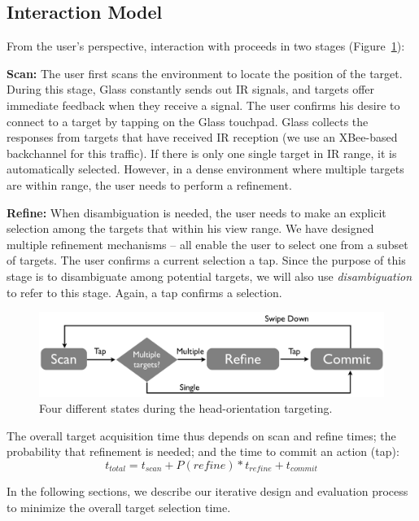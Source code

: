 \subsection{Interaction Model}
From the user's perspective, interaction with \systemname proceeds in two stages (Figure~\ref{fig:interaction}): 

{\bf Scan:} The user first scans the environment to locate the position of the target. During this stage, Glass constantly sends out IR signals, and  targets offer immediate feedback when they receive a signal. The user confirms his desire to connect to a target by tapping on the Glass touchpad. Glass collects the responses from targets that have received IR reception (we use an XBee-based backchannel for this traffic). If there is only one single target in IR range, it is automatically selected. However, in a dense environment where multiple targets are within range, the user needs to perform a refinement.

{\bf Refine:} When disambiguation is needed, the user needs to make an explicit selection among the targets that within his view range. We have designed multiple refinement mechanisms -- all enable the user to select one from a subset of targets. The user confirms a current selection a tap. Since the purpose of this stage is to disambiguate among potential targets, we will also use {\em disambiguation} to refer to this stage. Again, a tap confirms a selection.

\begin{figure}[t!]
\centering
\includegraphics[width=\columnwidth]{figures/interactionModel2.pdf}
\caption{Four different states during the head-orientation targeting.}
\label{fig:interaction}
\end{figure}

The overall target acquisition time thus depends on scan and refine times; the probability that refinement is needed; and the time to commit an action (tap):
\begin{equation}
t_{total}=t_{scan}+P(refine)*t_{refine}+t_{commit}
\end{equation}

In the following sections, we describe our iterative design and evaluation process to minimize the overall target selection time.

